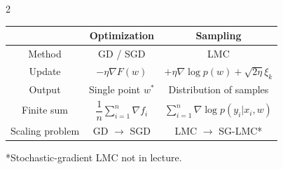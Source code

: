 \documentclass[10pt]{article}
\begin{document}
\begin{multicols*}{2}
\begin{tabular}{|c|c|c|}
\hline
& \textbf{Optimization} & \textbf{Sampling} \\[6pt]
\hline
Method & GD / SGD & LMC \\[6pt]
\hline
Update & $-\eta\nabla F(w)$ & $+\eta\nabla\log p(w) + \sqrt{2\eta}\xi_k$ \\[6pt]
\hline
Output & Single point $w^*$ & Distribution of samples \\[6pt]
\hline
Finite sum & $\dfrac{1}{n}\displaystyle\sum_{i=1}^{n}\nabla f_i$ & $\displaystyle\sum_{i=1}^{n}\nabla\log p(y_i|x_i,w)$ \\[12pt]
\hline
Scaling problem & GD $\rightarrow$ SGD & LMC $\rightarrow$ SG-LMC* \\[6pt]
\hline
\end{tabular}
*Stochastic-gradient LMC not in lecture.


\end{multicols*}
\end{document}
